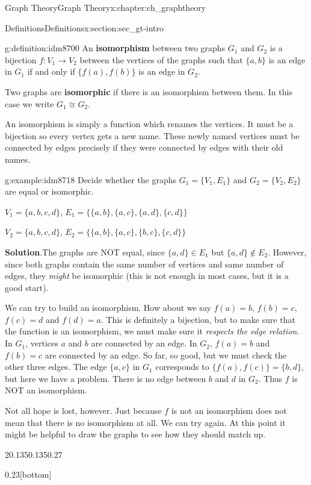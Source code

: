 \documentclass[oneside,10pt,]{book}
\newcommand{\terminology}[1]{\textbf{#1}}
\numberwithin{equation}{chapter}
\def\isom{\cong}
\begin{document}
\begin{chapterptx}{Graph Theory}{}{Graph Theory}{}{}{x:chapter:ch_graphtheory}
\begin{sectionptx}{Definitions}{}{Definitions}{}{}{x:section:sec_gt-intro}
\begin{definition}{}{g:definition:idm8700}%
 An \terminology{isomorphism} between two graphs \(G_1\) and \(G_2\) is a bijection \(f:V_1 \to V_2\) between the vertices of the graphs such that \(\{a,b\}\) is an edge in \(G_1\) if and only if \(\{f(a), f(b)\}\) is an edge in \(G_2\).%
\par
Two graphs are \terminology{isomorphic} if there is an isomorphism between them. In this case we write \(G_1 \isom G_2\).%
\end{definition}
An isomorphism is simply a function which renames the vertices. It must be a bijection so every vertex gets a new name. These newly named vertices must be connected by edges precisely if they were connected by edges with their old names.%
\begin{example}{}{g:example:idm8718}%
Decide whether the graphs \(G_1 = \{V_1, E_1\}\) and \(G_2 = \{V_2, E_2\}\) are equal or isomorphic.%
\par
\(V_1 = \{a,b,c,d\}\), \(E_1 = \{\{a,b\}, \{a,c\}, \{a,d\}, \{c,d\}\}\)%
\par
\(V_2 = \{a,b,c,d\}\), \(E_2 = \{\{a,b\}, \{a,c\}, \{b,c\}, \{c,d\}\}\)%
\par\smallskip%
\noindent\textbf{Solution}.\hypertarget{g:solution:idm8729}{}\quad{}The graphs are NOT equal, since \(\{a,d\} \in E_1\) but \(\{a,d\} \notin E_2\). However, since both graphs contain the same number of vertices and same number of edges, they \emph{might} be isomorphic (this is not enough in most cases, but it is a good start).%
\par
We can try to build an isomorphism. How about we say \(f(a) = b\), \(f(b) = c\), \(f(c) = d\) and \(f(d) = a\). This is definitely a bijection, but to make sure that the function is an isomorphism, we must make sure it \emph{respects the edge relation}. In \(G_1\), vertices \(a\) and \(b\) are connected by an edge. In \(G_2\), \(f(a) = b\) and \(f(b) = c\) are connected by an edge. So far, so good, but we must check the other three edges. The edge \(\{a,c\}\) in \(G_1\) corresponds to \(\{f(a), f(c)\} = \{b,d\}\), but here we have a problem. There is no edge between \(b\) and \(d\) in \(G_2\). Thus \(f\) is NOT an isomorphism.%
\par
Not all hope is lost, however. Just because \(f\) is not an isomorphism does not mean that there is no isomorphism at all. We can try again. At this point it might be helpful to draw the graphs to see how they should match up.%
\begin{sidebyside}{2}{0.135}{0.135}{0.27}%
\begin{sbspanel}{0.23}[bottom]%
\end{sbspanel}
\end{sidebyside}
\end{example}
\end{sectionptx}
\end{chapterptx}
\end{document}
